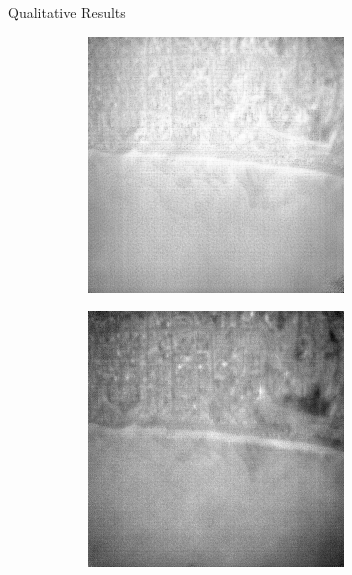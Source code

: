 \documentclass[final]{beamer}
\newlength{\colwidth}
\begin{document}
\begin{frame}[t]
\begin{columns}[t]
\begin{column}{\colwidth}
\begin{block}{Qualitative Results}
\begin{figure}
\begin{subfigure}[b]{0.19\textwidth}
            \label{fig:cycleGan}
        \end{subfigure}
        \hfill
        \begin{subfigure}[b]{0.19\textwidth}
            \centering
            \includegraphics[width=\textwidth]{../figs/outputs/cut/28.png}
            \label{fig:cut}
        \end{subfigure}
        \hfill
        \begin{subfigure}[b]{0.19\textwidth}
            \centering
            \includegraphics[width=\textwidth]{../figs/outputs/petit/28.png}

\end{subfigure}
\end{figure}
\end{block}
\end{column}
\end{columns}
\end{frame}
\end{document}
